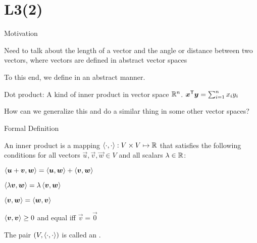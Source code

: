 \documentclass[handout,fleqn,aspectratio=169]{beamer}
\begin{document}
\section{L3(2)}
\begin{frame}{Motivation}

\plitemsep 0.1in

\bci 
\item Need to talk about the length of a vector and the angle or distance between two vectors, where vectors are defined in abstract vector spaces

\item To this end, we define  in an abstract manner.

\item Dot product: A kind of inner product in vector space ${\mathbb R}^n$. ${\bm{x}}^{\mathsf{T}} \bm{y} = \sum_{i=1}^n x_i y_i$ 


\bigskip
\item \question How can we generalize this and do a similar thing in some other vector spaces?
\eci
\end{frame}

\begin{frame}{Formal Definition}

\plitemsep 0.1in

\bci 
\item An inner product is a mapping $\left\langle \cdot, \cdot \right\rangle: V \times V \mapsto {\mathbb R}$ that satisfies the following conditions for all vectors $\vec{u},\vec{v},\vec{w} \in V$ and all scalars $\lambda \in {\mathbb R}$:

\medskip
\bce
\item $\left\langle \bm{u}+ \bm{v}, \bm{w} \right\rangle = \left\langle \bm{u}, \bm{w} \right\rangle + \left\langle \bm{v}, \bm{w} \right\rangle$
\item $\left\langle \lambda \bm{v}, \bm{w} \right\rangle = \lambda \left\langle \bm{v}, \bm{w} \right\rangle$
\item $\left\langle \bm{v}, \bm{w} \right\rangle = \left\langle \bm{w}, \bm{v} \right\rangle$
\item $\left\langle \bm{v}, \bm{v} \right\rangle \ge 0$ and equal iff $\vec{v}=\vec{0}$
\ece
\medskip

\item The pair $(V,\left\langle \cdot, \cdot \right\rangle)$ is called an .

\eci
\end{frame}
\end{document}
